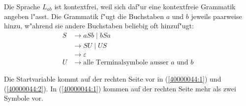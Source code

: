 \begin{loesung}
\begin{teilaufgaben}
\item
Die Sprache $L_{ab}$ ist kontextfrei, weil sich daf"ur eine kontextfreie
Grammatik angeben l"asst.
Die Grammatik f"ugt die Buchstaben $a$ und $b$ jeweils paarweise
hinzu, w"ahrend sie andere Buchstaben beliebig oft hinzuf"ugt:
\begin{align}
S&\rightarrow aSb\;|\; bSa \label{40000044:1}\\
 &\rightarrow SU \;|\; US  \label{40000044:2}\\
 &\rightarrow \varepsilon  \label{40000044:3}\\
U&\rightarrow \text{alle Terminalsymbole ausser $a$ und $b$} \label{40000044:4}
\end{align}
\item
Die Startvariable kommt auf der rechten Seite vor in (\ref{40000044:1})
und (\ref{40000044:2}).
In (\ref{40000044:1}) kommen auf der rechten Seite mehr als zwei Symbole vor.

\end{teilaufgaben}
\end{loesung}
